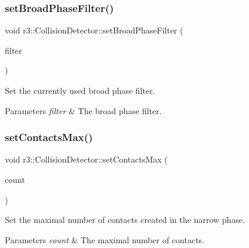 \subsubsection{\texorpdfstring{set\+Broad\+Phase\+Filter()}{setBroadPhaseFilter()}}
{\footnotesize\ttfamily void r3\+::\+Collision\+Detector\+::set\+Broad\+Phase\+Filter (\begin{DoxyParamCaption}\item[{\mbox{\hyperlink{classr3_1_1_collision_detector_aa8ed51d53c6f6ce545c93ad0e356d6de}{Broad\+Phase\+Filter\+\_\+\+Ptr}}}]{filter }\end{DoxyParamCaption})}



Set the currently used broad phase filter. 


\begin{DoxyParams}{Parameters}
{\em filter} & The broad phase filter. \\
\hline
\end{DoxyParams}
\mbox{\label{classr3_1_1_collision_detector_a1920971e75d79df7806a8d803a010e62}} 
\subsubsection{\texorpdfstring{set\+Contacts\+Max()}{setContactsMax()}}
{\footnotesize\ttfamily void r3\+::\+Collision\+Detector\+::set\+Contacts\+Max (\begin{DoxyParamCaption}\item[{int}]{count }\end{DoxyParamCaption})}



Set the maximal number of contacts created in the narrow phase. 


\begin{DoxyParams}{Parameters}
{\em count} & The maximal number of contacts. \\
\hline
\end{DoxyParams}
\mbox{\label{classr3_1_1_collision_detector_a4d6081592ca35150cd6c8fe0d551c64d}} 
